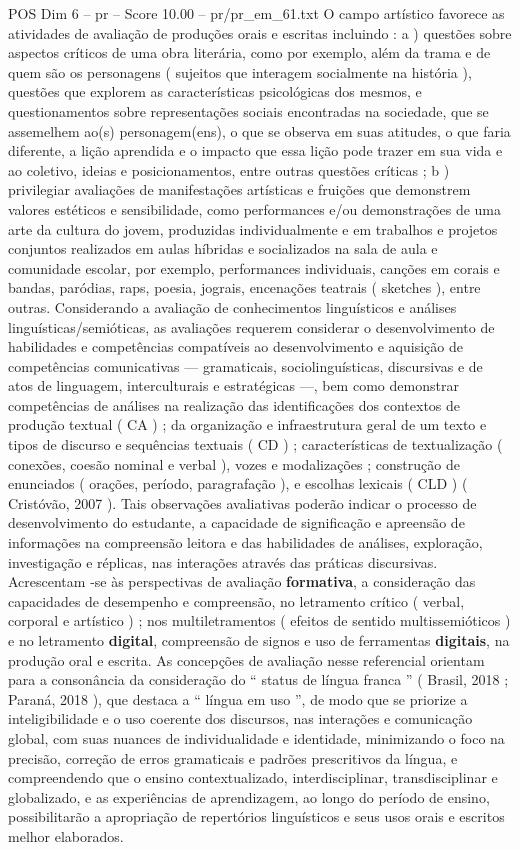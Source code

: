 \begin{textsample}{POS Dim 6 – pr – Score 10.00 – pr/pr\_em\_61.txt}
O campo artístico favorece as atividades de avaliação de produções orais e escritas incluindo : a ) questões sobre aspectos críticos de uma obra literária, como por exemplo, além da trama e de quem são os personagens ( sujeitos que interagem socialmente na história ), questões que explorem as características psicológicas dos mesmos, e questionamentos sobre representações sociais encontradas na sociedade, que se assemelhem ao(s) personagem(ens), o que se observa em suas atitudes, o que faria diferente, a lição aprendida e o impacto que essa lição pode trazer em sua vida e ao coletivo, ideias e posicionamentos, entre outras questões críticas ; b ) privilegiar avaliações de manifestações artísticas e fruições que demonstrem valores estéticos e sensibilidade, como performances e/ou demonstrações de uma arte da cultura do jovem, produzidas individualmente e em trabalhos e projetos conjuntos realizados em aulas híbridas e socializados na sala de aula e comunidade escolar, por exemplo, performances individuais, canções em corais e bandas, paródias, raps, poesia, jograis, encenações teatrais ( sketches ), entre outras.
Considerando a avaliação de conhecimentos linguísticos e análises linguísticas/semióticas, as avaliações requerem considerar o desenvolvimento de habilidades e competências compatíveis ao desenvolvimento e aquisição de competências comunicativas — gramaticais, sociolinguísticas, discursivas e de atos de linguagem, interculturais e estratégicas —, bem como demonstrar competências de análises na realização das identificações dos contextos de produção textual ( CA ) ; da organização e infraestrutura geral de um texto e tipos de discurso e sequências textuais ( CD ) ; características de textualização ( conexões, coesão nominal e verbal ), vozes e modalizações ; construção de enunciados ( orações, período, paragrafação ), e escolhas lexicais ( CLD ) ( Cristóvão, 2007 ).
Tais observações avaliativas poderão indicar o processo de desenvolvimento do estudante, a capacidade de significação e apreensão de informações na compreensão leitora e das habilidades de análises, exploração, investigação e réplicas, nas interações através das práticas discursivas.
Acrescentam -se às perspectivas de avaliação \textbf{formativa}, a consideração das capacidades de desempenho e compreensão, no letramento crítico ( verbal, corporal e artístico ) ; nos multiletramentos ( efeitos de sentido multissemióticos ) e no letramento \textbf{digital}, compreensão de signos e uso de ferramentas \textbf{digitais}, na produção oral e escrita.
As concepções de avaliação nesse referencial orientam para a consonância da consideração do “ status de língua franca ” ( Brasil, 2018 ; Paraná, 2018 ), que destaca a “ língua em uso ”, de modo que se priorize a inteligibilidade e o uso coerente dos discursos, nas interações e comunicação global, com suas nuances de individualidade e identidade, minimizando o foco na precisão, correção de erros gramaticais e padrões prescritivos da língua, e compreendendo que o ensino contextualizado, interdisciplinar, transdisciplinar e globalizado, e as experiências de aprendizagem, ao longo do período de ensino, possibilitarão a apropriação de repertórios linguísticos e seus usos orais e escritos melhor elaborados.

\end{textsample}
